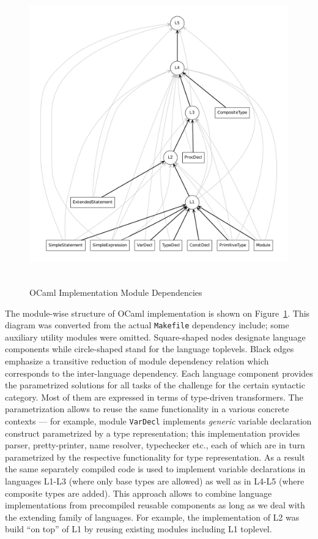 \begin{figure}
\begin{center}
\includegraphics[height=13cm, width=14cm]{ocaml/depend.pdf}
\end{center}
\caption{OCaml Implementation Module Dependencies}
\label{ocamlmoddep}
\end{figure}

The module-wise structure of OCaml implementation is shown on Figure~\ref{ocamlmoddep}. This diagram
was converted from the actual \verb|Makefile| dependency include; some auxiliary utility modules were
omitted. Square-shaped nodes designate language components while circle-shaped stand for the 
language toplevels. Black edges emphasize a transitive reduction of module dependency relation which corresponds 
to the inter-language dependency. Each language component provides the parametrized solutions for all
tasks of the challenge for the certain syntactic category. Most of them are expressed in terms of
type-driven transformers. The parametrization allows to reuse the same functionality in a various
concrete contexts --- for example, module \verb|VarDecl| implements \emph{generic} variable declaration
construct parametrized by a type representation; this implementation provides parser, pretty-printer, name resolver,
typechecker etc., each of which are in turn parametrized by the respective functionality for type representation.
As a result the same separately compiled code is used to implement variable declarations in languages
L1-L3 (where only base types are allowed) as well as in L4-L5 (where composite types are added). This approach
allows to combine language implementations from precompiled reusable components as long as we deal with the extending
family of languages. For example, the implementation of L2 was build ``on top'' of L1 by reusing existing modules 
including L1 toplevel.


